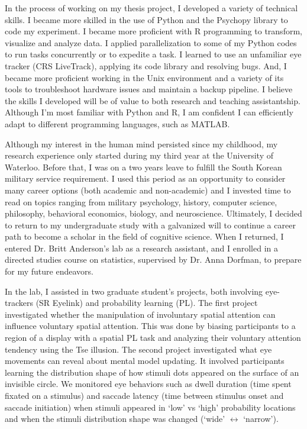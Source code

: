 \documentclass[12pt]{article}
\begin{document}
	In the process of working on my thesis project, I developed a variety of technical skills. I became more skilled in the use of Python and the Psychopy library to code my experiment. I became more proficient with R programming to transform, visualize and analyze data. I applied parallelization to some of my Python codes to run tasks concurrently or to expedite a task. I learned to use an unfamiliar eye tracker (CRS LiveTrack), applying its code library and resolving bugs. And, I became more proficient working in the Unix environment and a variety of its tools to troubleshoot hardware issues and maintain a backup pipeline. I believe the skills I developed will be of value to both research and teaching assistantship. Although I’m most familiar with Python and R, I am confident I can efficiently adapt to different programming languages, such as MATLAB.
	
	Although my interest in the human mind persisted since my childhood, my research experience only started during my third year at the University of Waterloo. Before that, I was on a two years leave to fulfill the South Korean military service requirement. I used this period as an opportunity to consider many career options (both academic and non-academic) and I invested time to read on topics ranging from military psychology, history, computer science, philosophy, behavioral economics, biology, and neuroscience. Ultimately, I decided to return to my undergraduate study with a galvanized will to continue a career path to become a scholar in the field of cognitive science. When I returned, I entered Dr. Britt Anderson’s lab as a research assistant, and I enrolled in a directed studies course on statistics, supervised by Dr. Anna Dorfman, to prepare for my future endeavors.
	
	In the lab, I assisted in two graduate student's projects, both involving eye-trackers (SR Eyelink) and probability learning (PL). The first project investigated whether the manipulation of involuntary spatial attention can influence voluntary spatial attention. This was done by biasing participants to a region of a display with a spatial PL task and analyzing their voluntary attention tendency using the Tse illusion. The second project investigated what eye movements can reveal about mental model updating. It involved participants learning the distribution shape of how stimuli dots appeared on the surface of an invisible circle. We monitored eye behaviors such as dwell duration (time spent fixated on a stimulus) and saccade latency (time between stimulus onset and saccade initiation) when stimuli appeared in `low' vs `high' probability locations and when the stimuli distribution shape was changed (`wide' $\leftrightarrow$ `narrow').
	
\end{document}
